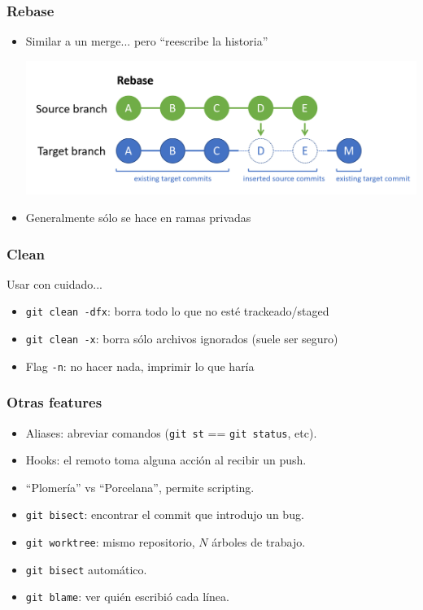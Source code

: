 \documentclass[a4paper, 12pt, aspectratio=169,
\ifhandout handout \else \fi
]{beamer}
\begin{document}
\begin{frame}
    \frametitle{Rebase}
    \begin{itemize}
        \item Similar a un merge... pero ``reescribe la historia''
            \begin{minipage}[t][4cm]{\textwidth}
                \begin{center}
                    \includegraphics[keepaspectratio, height=0.5\textheight, width=\linewidth]{merge3.png}
                \end{center}
            \end{minipage}
        \item Generalmente sólo se hace en ramas privadas
    \end{itemize}
\end{frame}

\begin{frame}[fragile]
    \frametitle{Clean}
    Usar con cuidado...
    \begin{itemize}
        \item \lstinline`git clean -dfx`: borra todo lo que no esté trackeado/staged
        \item \lstinline`git clean -x`: borra sólo archivos ignorados (suele ser seguro)
        \item Flag \texttt{-n}: no hacer nada, imprimir lo que haría
    \end{itemize}
\end{frame}

\begin{frame}[fragile]
    \frametitle{Otras features}
    \begin{itemize}
        \item Aliases: abreviar comandos (\lstinline`git st` == \lstinline`git status`, etc).
        \item Hooks: el remoto toma alguna acción al recibir un push.
        \item ``Plomería'' vs ``Porcelana'', permite scripting.
        \item \lstinline`git bisect`: encontrar el commit que introdujo un bug.
        \item \lstinline`git worktree`: mismo repositorio, $N$ árboles de trabajo.
        \item \lstinline`git bisect` automático.
        \item \lstinline`git blame`: ver quién escribió cada línea.
    \end{itemize}
\end{frame}
\end{document}
